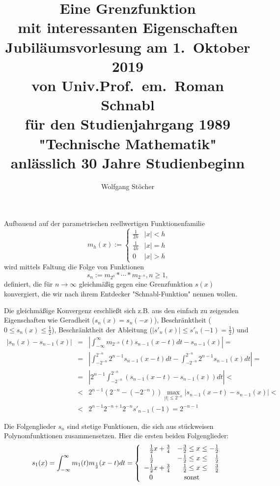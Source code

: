 \documentclass[german]{article}
\title{Eine Grenzfunktion\\ mit interessanten Eigenschaften\\[0.4em]
\large Jubiläumsvorlesung am 1.\ Oktober 2019\\
von Univ.Prof.\ em.\ Roman Schnabl\\
für den Studienjahrgang 1989 "Technische Mathematik"\\
anlässlich 30 Jahre Studienbeginn
}
\author{Wolfgang Stöcher}
\begin{document}
\maketitle

Aufbauend auf der parametrischen reellwertigen Funktionenfamilie
\[
m_h(x) := \left\{
	\begin{array}{ll}
		\frac{1}{2h} & |x| < h \\[2pt]
		\frac{1}{4h} & |x| = h \\[2pt]
		0            & |x| > h 
	\end {array} 
	\right.
\]
wird mittels Faltung die Folge von Funktionen
\[
s_n := m_{2^0} \ast \cdots \ast m_{2^{-n}}, n \ge 1,
\]
definiert, die für $n \rightarrow \infty$ gleichmäßig gegen eine Grenzfunktion $s(x)$ konvergiert,
die wir nach ihrem Entdecker "Schnabl-Funktion" nennen wollen.

Die gleichmäßige Konvergenz erschließt sich z.B. aus den einfach zu zeigenden Eigenschaften
wie Geradheit ($s_n(x) = s_n(-x)$), Beschränktheit ($0 \le s_n(x) \le \frac{1}{2}$),
Beschränktheit der Ableitung ($|s'_{n}(x)| \le s'_n(-1) = \frac{1}{2}$) und
\[
\begin{array}{lcl}
  \left | s_{n}(x) - s_{n-1}(x) \right | & = & \left | \int_{-\infty}^{\infty} m_{2^{-n}}(t)s_{n-1}(x-t) dt - s_{n-1}(x) \right | = \\[0.4em]
                                         & = & \left | \int_{-2^{-n}}^{2^{-n}} 2^{n-1} s_{n-1}(x-t) dt - \int_{-2^{-n}}^{2^{-n}} 2^{n-1} s_{n-1}(x) dt \right | = \\[0.4em]
                                         & = & \left | 2^{n-1} \int_{-2^{-n}}^{2^{-n}} (s_{n-1}(x-t) - s_{n-1}(x)) dt \right | < \\[0.2em]
                                         & < & 2^{n-1} (2^{-n} - (-2^{-n})) \max_{|t| \le 2^{-n}} \left | s_{n-1}(x-t) - s_{n-1}(x) \right | < \\[0.2em]
                                         & < & 2^{n-1} 2^{-n+1} 2^{-n} s'_{n-1}(-1) = 2^{-n-1}
\end {array}
\]

Die Folgenglieder $s_n$ sind stetige Funktionen, die sich aus stückweisen Polynomfunktionen zusammensetzen.
Hier die ersten beiden Folgenglieder:
\[
s_1(x) = \int_{-\infty}^{\infty} m_1(t)m_\frac{1}{2}(x-t) dt = \left\{
	\begin{array}{ll}
		\hphantom{-}\frac{1}{2}x + \frac{3}{4}&           - \frac{3}{2} \le x \le           - \frac{1}{2} \\[2pt]
		\hphantom{-}\frac{1}{2}               &           - \frac{1}{2} \le x \le \hphantom{-}\frac{1}{2} \\[2pt]
		          - \frac{1}{2}x + \frac{3}{4}& \hphantom{-}\frac{1}{2} \le x \le \hphantom{-}\frac{3}{2} \\[2pt]
		\hphantom{-}0                         & \quad\mbox{sonst} 
	\end {array} 
	\right.
\]
\end{document}
